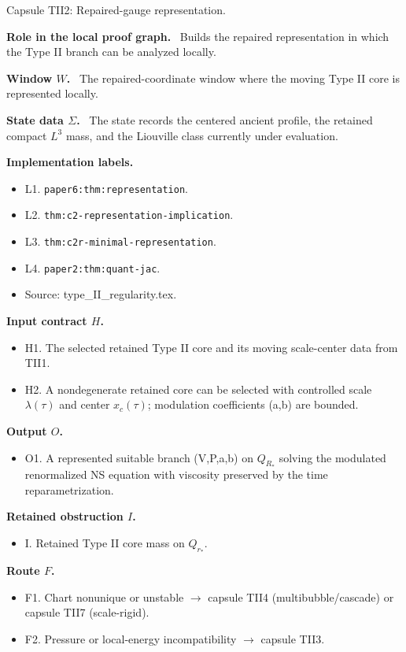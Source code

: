 \documentclass[11pt]{amsart}
\newcommand{\capsulefield}[1]{\par\smallskip\noindent\textbf{#1.}\ }
\begin{document}
\begin{proofcapsule}{Capsule TII2: Repaired-gauge representation.}
  \capsulefield{Role in the local proof graph}
  Builds the repaired representation in which the Type II branch can be analyzed locally.

  \capsulefield{Window \(W\)}
The repaired-coordinate window where the moving Type II core is represented locally.

  \capsulefield{State data \(\Sigma\)}
The state records the centered ancient profile, the retained compact $L^3$ mass, and the Liouville class currently under evaluation.

  \capsulefield{Implementation labels}
  \begin{itemize}[leftmargin=1.8em]
  \item L1. \texttt{paper6:thm:representation}.
  \item L2. \texttt{thm:c2-representation-implication}.
  \item L3. \texttt{thm:c2r-minimal-representation}.
  \item L4. \texttt{paper2:thm:quant-jac}.
  \item Source: type\_II\_regularity.tex.
  \end{itemize}

  \capsulefield{Input contract \(H\)}
  \begin{itemize}[leftmargin=1.8em]
  \item H1. The selected retained Type II core and its moving scale-center data from TII1.
  \item H2. A nondegenerate retained core can be selected with controlled scale $\lambda(\tau)$ and center $x_c(\tau)$; modulation coefficients (a,b) are bounded.
  \end{itemize}

  \capsulefield{Output \(O\)}
  \begin{itemize}[leftmargin=1.8em]
  \item O1. A represented suitable branch (V,P,a,b) on $Q_{R_*}$ solving the modulated renormalized NS equation with viscosity preserved by the time reparametrization.
  \end{itemize}

  \capsulefield{Retained obstruction \(I\)}
  \begin{itemize}[leftmargin=1.8em]
  \item I. Retained Type II core mass on $Q_{r_*}$.
  \end{itemize}

  \capsulefield{Route \(F\)}
  \begin{itemize}[leftmargin=1.8em]
  \item F1. Chart nonunique or unstable $\to$ capsule TII4 (multibubble/cascade) or capsule TII7 (scale-rigid).
  \item F2. Pressure or local-energy incompatibility $\to$ capsule TII3.
  \end{itemize}


\end{proofcapsule}
\end{document}
